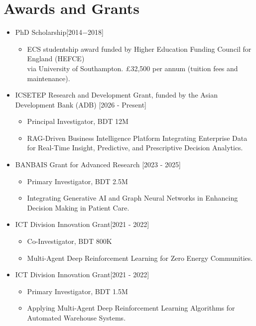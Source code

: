 \documentclass{article}
\begin{document}
 \section{Awards and Grants}
 \begin{itemize}
\item PhD Scholarship\hfill [2014$-$2018]
    \begin{itemize}
    \item ECS studentship award funded by Higher Education Funding Council for England (HEFCE)\\ via University of Southampton. £32,500 per annum (tuition fees and maintenance).
    \end{itemize}

\item ICSETEP Research and Development Grant, funded by the Asian Development Bank (ADB) \hfill [2026 - Present]
    \begin{itemize}
    \item Principal Investigator, BDT 12M
    \item RAG-Driven Business Intelligence Platform Integrating Enterprise Data for Real-Time Insight, Predictive, and Prescriptive Decision Analytics.
    \end{itemize}

    
\item BANBAIS Grant for Advanced Research \hfill [2023 - 2025]
    \begin{itemize}
    \item Primary Investigator, BDT 2.5M
    \item Integrating Generative AI and Graph Neural Networks in Enhancing Decision Making in Patient Care. 
    \end{itemize}
    
\item ICT Division Innovation Grant\hfill [2021 - 2022]
    \begin{itemize}
    \item Co-Investigator, BDT 800K
    \item Multi-Agent Deep Reinforcement Learning for Zero Energy Communities.
    \end{itemize}

\item ICT Division Innovation Grant\hfill [2021 - 2022]
    \begin{itemize}
    \item Primary Investigator, BDT 1.5M
    \item Applying Multi-Agent Deep Reinforcement Learning Algorithms for Automated Warehouse Systems.
    \end{itemize}
    

\end{itemize}
\end{document}
